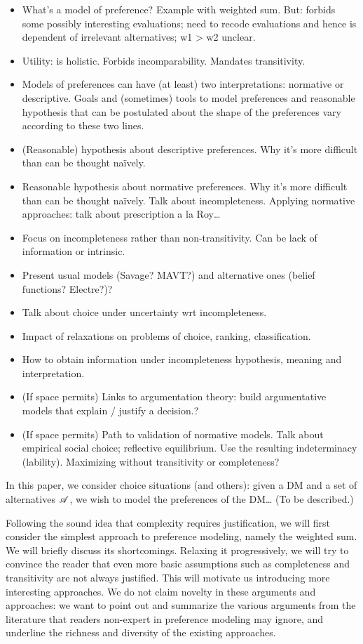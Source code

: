 \documentclass[french, english]{llncs}
\begin{document}
\begin{itemize}
	\item What’s a model of preference? Example with weighted sum. But: forbids some possibly interesting evaluations; need to recode evaluations and hence is dependent of irrelevant alternatives; w1 > w2 unclear.
	\item Utility: is holistic. Forbids incomparability. Mandates transitivity.
	\item Models of preferences can have (at least) two interpretations: normative or descriptive. Goals and (sometimes) tools to model preferences and reasonable hypothesis that can be postulated about the shape of the preferences vary according to these two lines.
	\item (Reasonable) hypothesis about descriptive preferences. Why it’s more difficult than can be thought naïvely. 
	\item Reasonable hypothesis about normative preferences. Why it’s more difficult than can be thought naïvely. Talk about incompleteness. Applying normative approaches: talk about prescription a la Roy…
	\item Focus on incompleteness rather than non-transitivity. Can be lack of information or intrinsic.
	\item Present usual models (Savage? MAVT?) and alternative ones (belief functions? Electre?)?
	\item Talk about choice under uncertainty wrt incompleteness.
	\item Impact of relaxations on problems of choice, ranking, classification.
	\item How to obtain information under incompleteness hypothesis, meaning and interpretation.
	\item (If space permits) Links to argumentation theory: build argumentative models that explain / justify a decision.?
	\item (If space permits) Path to validation of normative models. Talk about empirical social choice; reflective equilibrium. Use the resulting indeterminacy (lability). Maximizing without transitivity or completeness?
\end{itemize}

In this paper, we consider choice situations (and others): given a \ac{DM} and a set of alternatives $\mathscr{A}$, we wish to model the preferences of the \ac{DM}… (To be described.)

Following the sound idea that complexity requires justification, we will first consider the simplest approach to preference modeling, namely the weighted sum. We will briefly discuss its shortcomings. Relaxing it progressively, we will try to convince the reader that even more basic assumptions such as completeness and transitivity are not always justified. This will motivate us introducing more interesting approaches. We do not claim novelty in these arguments and approaches: we want to point out and summarize the various arguments from the literature that readers non-expert in preference modeling may ignore, and underline the richness and diversity of the existing approaches. 
\end{document}

